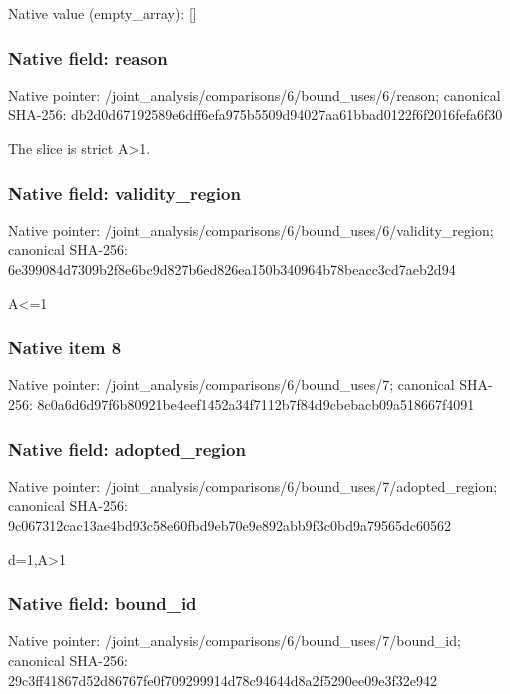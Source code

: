 \documentclass[10pt,a4paper]{article}
\begin{document}
Native value (empty\_\allowbreak{}array): []

\subsubsection{Native field: reason}
Native pointer: /joint\_\allowbreak{}analysis/comparisons/6/bound\_\allowbreak{}uses/6/reason; canonical SHA-256: db2d0d67192589e6dff6efa975b5509d94027aa61bbad0122f6f2016fefa6f30

\begingroup\raggedright\sloppy The slice is strict A>1.\par\endgroup

\subsubsection{Native field: validity\_\allowbreak{}region}
Native pointer: /joint\_\allowbreak{}analysis/comparisons/6/bound\_\allowbreak{}uses/6/validity\_\allowbreak{}region; canonical SHA-256: 6e399084d7309b2f8e6bc9d827b6ed826ea150b340964b78beacc3cd7aeb2d94

\begingroup\raggedright\sloppy A<=\allowbreak{}1\par\endgroup

\subsubsection{Native item 8}
Native pointer: /joint\_\allowbreak{}analysis/comparisons/6/bound\_\allowbreak{}uses/7; canonical SHA-256: 8c0a6d6d97f6b80921be4eef1452a34f7112b7f84d9cbebacb09a518667f4091

\subsubsection{Native field: adopted\_\allowbreak{}region}
Native pointer: /joint\_\allowbreak{}analysis/comparisons/6/bound\_\allowbreak{}uses/7/adopted\_\allowbreak{}region; canonical SHA-256: 9c067312cac13ae4bd93c58e60fbd9eb70e9e892abb9f3c0bd9a79565dc60562

\begingroup\raggedright\sloppy d=\allowbreak{}1,\allowbreak{}A>1\par\endgroup

\subsubsection{Native field: bound\_\allowbreak{}id}
Native pointer: /joint\_\allowbreak{}analysis/comparisons/6/bound\_\allowbreak{}uses/7/bound\_\allowbreak{}id; canonical SHA-256: 29c3ff41867d52d86767fe0f709299914d78c94644d8a2f5290ee09e3f32e942
\end{document}
